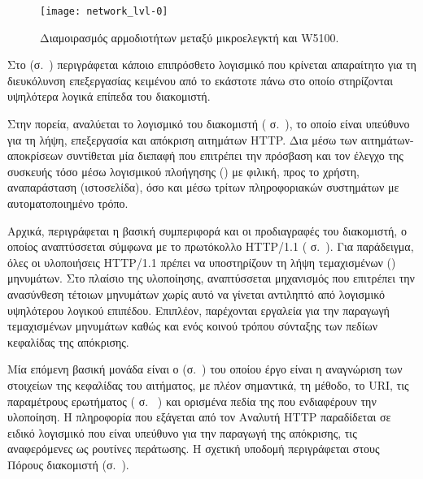 \begin{figure}
    \caption{Διαμοιρασμός αρμοδιοτήτων μεταξύ μικροελεγκτή και W5100.
    \label{fig:network:lvl-0}}
    \begin{center}
    \texttt{[image: network\_lvl-0]}
    \end{center}
\end{figure}

Στο  (σ.~\pageref{subsec:network:utilities})
περιγράφεται κάποιο επιπρόσθετο λογισμικό που κρίνεται απαραίτητο για τη
διευκόλυνση επεξεργασίας κειμένου από το εκάστοτε  πάνω στο οποίο
στηρίζονται υψηλότερα λογικά επίπεδα του διακομιστή.

Στην πορεία, αναλύεται το λογισμικό του διακομιστή (
σ.~\pageref{sec:http-server}), το οποίο είναι υπεύθυνο για τη λήψη, επεξεργασία
και απόκριση αιτημάτων HTTP. Δια μέσω των αιτημάτων-αποκρίσεων συντίθεται μία
διεπαφή που επιτρέπει την πρόσβαση και τον έλεγχο της συσκευής τόσο μέσω
λογισμικού πλοήγησης () με φιλική, προς το χρήστη, αναπαράσταση
(ιστοσελίδα), όσο και μέσω τρίτων πληροφοριακών συστημάτων με αυτοματοποιημένο
τρόπο.

Αρχικά, περιγράφεται η βασική συμπεριφορά και οι προδιαγραφές του διακομιστή, ο
οποίος αναπτύσσεται σύμφωνα με το πρωτόκολλο HTTP/1.1
( σ.~\pageref{subsec:network:server-base}).
Για παράδειγμα, όλες οι υλοποιήσεις HTTP/1.1 πρέπει να υποστηρίζουν τη λήψη
τεμαχισμένων () μηνυμάτων. Στο πλαίσιο της υλοποίησης, αναπτύσσεται
μηχανισμός που επιτρέπει την ανασύνθεση τέτοιων μηνυμάτων χωρίς αυτό να γίνεται
αντιληπτό από λογισμικό υψηλότερου λογικού επιπέδου. Επιπλέον, παρέχονται
εργαλεία για την παραγωγή τεμαχισμένων μηνυμάτων καθώς και ενός κοινού τρόπου
σύνταξης των πεδίων κεφαλίδας της απόκρισης.

Μία επόμενη βασική μονάδα είναι ο 
(σ.~\pageref{subsec:network:http-parser}) του οποίου έργο είναι η αναγνώριση των
στοιχείων της κεφαλίδας του αιτήματος, με πλέον σημαντικά, τη μέθοδο, το URI,
τις παραμέτρους ερωτήματος ( σ.~%
\pageref{ssubsec:network:query-string}) και ορισμένα πεδία της που ενδιαφέρουν
την υλοποίηση. Η πληροφορία που εξάγεται από τον Αναλυτή HTTP παραδίδεται σε
ειδικό λογισμικό που είναι υπεύθυνο για την παραγωγή της απόκρισης, τις
αναφερόμενες ως ρουτίνες περάτωσης. Η σχετική υποδομή περιγράφεται στους Πόρους
διακομιστή (σ.~\pageref{subsec:network:resource}).

